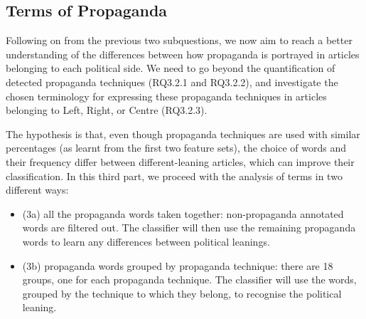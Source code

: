 \subsection{Terms of Propaganda}
\label{ssec:ps_prop_leaning_classifier_terms}

Following on from the previous two subquestions, we now aim to reach a better understanding of the differences between how propaganda is portrayed in articles belonging to each political side.
We need to go beyond the quantification of detected propaganda techniques (RQ3.2.1 and RQ3.2.2), and investigate the chosen terminology for expressing these propaganda techniques in articles belonging to Left, Right, or Centre (RQ3.2.3). %

The hypothesis is that, even though propaganda techniques are used with similar percentages (as learnt from the first two feature sets), the choice of words and their frequency differ between different-leaning articles, which can improve their classification.
%
In this third part, we proceed with the analysis of terms in two different ways:
\begin{itemize}
    \item (3a) all the propaganda words taken together: non-propaganda annotated words are filtered out. The classifier will then use the remaining propaganda words to learn any differences between political leanings.
    \item (3b) propaganda words grouped by propaganda technique: there are 18 groups, one for each propaganda technique. The classifier will use the words, grouped by the technique to which they belong, to recognise the political leaning.
\end{itemize}


